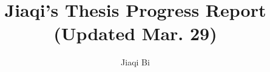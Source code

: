 \documentclass[preprint,12pt]{elsarticle}
\begin{document}
\begin{frontmatter}


\title{Jiaqi's Thesis Progress Report (Updated Mar. 29)}




\author[rvt]{Jiaqi Bi}

\address[rvt]{Western University, \\ Schulich School of Medicine \& Dentistry, \\ Department of Epidemiology and Biostatistics}





\end{frontmatter}
\end{document}
